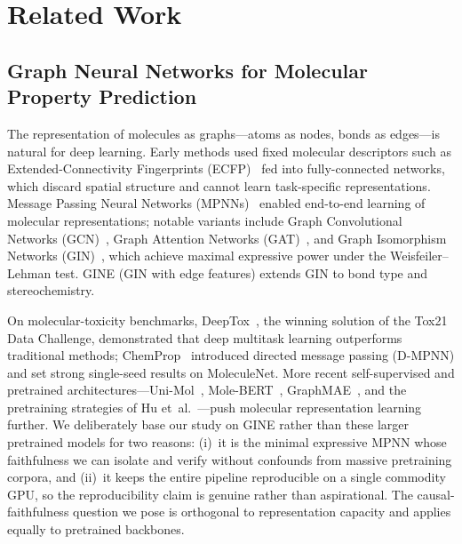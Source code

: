\documentclass[a4paper,fleqn]{cas-dc}
\begin{document}
\section{Related Work}
\subsection{Graph Neural Networks for Molecular Property Prediction}
The representation of molecules as graphs---atoms as nodes, bonds as edges---is natural for deep learning. Early methods used fixed molecular descriptors such as Extended-Connectivity Fingerprints (ECFP)~\cite{rogers2010extended} fed into fully-connected networks, which discard spatial structure and cannot learn task-specific representations. Message Passing Neural Networks (MPNNs)~\cite{gilmer2017neural} enabled end-to-end learning of molecular representations; notable variants include Graph Convolutional Networks (GCN)~\cite{kipf2017semi}, Graph Attention Networks (GAT)~\cite{velivckovic2018graph}, and Graph Isomorphism Networks (GIN)~\cite{xu2019powerful}, which achieve maximal expressive power under the Weisfeiler--Lehman test. GINE (GIN with edge features) extends GIN to bond type and stereochemistry.

On molecular-toxicity benchmarks, DeepTox~\cite{mayr2016deeptox}, the winning solution of the Tox21 Data Challenge, demonstrated that deep multitask learning outperforms traditional methods; ChemProp~\cite{yang2019analyzing} introduced directed message passing (D-MPNN) and set strong single-seed results on MoleculeNet. More recent self-supervised and pretrained architectures---Uni-Mol~\cite{zhou2022unimol}, Mole-BERT~\cite{xia2023molebert}, GraphMAE~\cite{zhang2022graphmae}, and the pretraining strategies of Hu et~al.~\cite{hu2020strategies}---push molecular representation learning further. We deliberately base our study on GINE rather than these larger pretrained models for two reasons: (i)~it is the minimal expressive MPNN whose faithfulness we can isolate and verify without confounds from massive pretraining corpora, and (ii)~it keeps the entire pipeline reproducible on a single commodity GPU, so the reproducibility claim is genuine rather than aspirational. The causal-faithfulness question we pose is orthogonal to representation capacity and applies equally to pretrained backbones.
\end{document}
